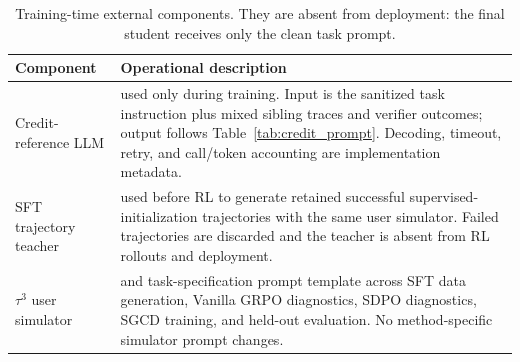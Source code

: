\begin{table}[h]
  \centering
  \venuecompacttablefont
  \setlength{\tabcolsep}{3pt}
  \begin{tabular}{p{}p{}}
    \hline
    \textbf{Component} & \textbf{Operational description} \\
    \hline
    Credit-reference LLM &
      \creditreferenceproviderphrase{} used only during training. Input is the
      sanitized task instruction plus mixed sibling traces and verifier outcomes;
      output follows Table~\ref{tab:credit_prompt}. Decoding, timeout, retry,
      and call/token accounting are implementation metadata. \\
    SFT trajectory teacher &
      \sftteacherproviderphrase{} used before RL to generate retained
      successful supervised-initialization trajectories with the same user
      simulator. Failed trajectories are discarded and the teacher is absent
      from RL rollouts and deployment. \\
    $\tau^3$ user simulator &
      \simulatorproviderphrase{} and task-specification prompt template
      across SFT data generation, Vanilla GRPO diagnostics, SDPO diagnostics, SGCD training, and
      held-out evaluation. No method-specific simulator prompt changes. \\
    \hline
  \end{tabular}
  \caption{Training-time external components. They are absent from deployment:
    the final student receives only the clean task prompt.}
  \label{tab:external_models}
\end{table}


